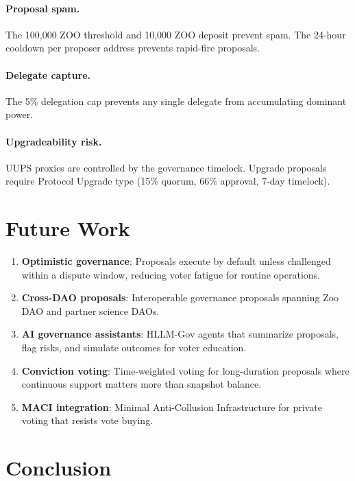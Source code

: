 \documentclass[11pt,letterpaper]{article}
\begin{document}
\paragraph{Proposal spam.} The 100{,}000 ZOO threshold and 10{,}000 ZOO deposit prevent spam. The 24-hour cooldown per proposer address prevents rapid-fire proposals.

\paragraph{Delegate capture.} The 5\% delegation cap prevents any single delegate from accumulating dominant power.

\paragraph{Upgradeability risk.} UUPS proxies are controlled by the governance timelock. Upgrade proposals require Protocol Upgrade type (15\% quorum, 66\% approval, 7-day timelock).

\section{Future Work}
\label{sec:future}

\begin{enumerate}
    \item \textbf{Optimistic governance}: Proposals execute by default unless challenged within a dispute window, reducing voter fatigue for routine operations.
    \item \textbf{Cross-DAO proposals}: Interoperable governance proposals spanning Zoo DAO and partner science DAOs.
    \item \textbf{AI governance assistants}: HLLM-Gov agents that summarize proposals, flag risks, and simulate outcomes for voter education.
    \item \textbf{Conviction voting}: Time-weighted voting for long-duration proposals where continuous support matters more than snapshot balance.
    \item \textbf{MACI integration}: Minimal Anti-Collusion Infrastructure for private voting that resists vote buying.
\end{enumerate}

\section{Conclusion}
\label{sec:conclusion}
\end{document}
